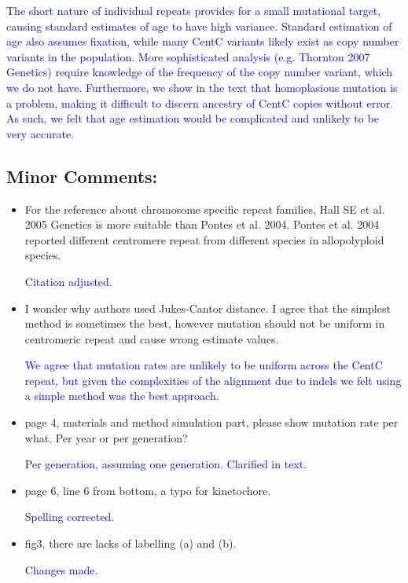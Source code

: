 \documentclass[]{article}
\newcommand{\res}[1]{\noindent \textcolor{blue}{{#1}} \\}
\begin{document}
\res{The short nature of individual repeats provides for a small mutational target, causing standard estimates of age to have high variance.  
Standard estimation of age also assumes fixation, while many CentC variants likely exist as copy number variants in the population. 
More sophisticated analysis (e.g. Thornton 2007 Genetics) require knowledge of the frequency of the copy number variant, which we do not have.
Furthermore, we show in the text that homoplasious mutation is a problem, making it difficult to discern ancestry of CentC copies without error.  
As such, we felt that age estimation would be complicated and unlikely to be very accurate.}

\subsection*{Minor Comments:}

\begin{itemize}
\item For the reference about chromosome specific repeat families, Hall SE et al. 2005 Genetics is more suitable than Pontes et al. 2004. Pontes et al. 2004 reported different centromere repeat from different species in allopolyploid species.

\res{Citation adjusted.}

\item I wonder why authors used Jukes-Cantor distance. I agree that the simplest method is sometimes the best, however mutation should not be uniform in centromeric repeat and cause wrong estimate values. 

\res{We agree that mutation rates are unlikely to be uniform across the CentC repeat, but given the complexities of the alignment due to indels we felt using a simple method was the best approach. }

\item page 4, materials and method simulation part, please show mutation rate per what. Per year or per generation? 

\res{Per generation, assuming one generation.  Clarified in text.}

\item page 6, line 6 from bottom, a typo for kinetochore.

\res{Spelling corrected.}

\item fig3, there are lacks of labelling (a) and (b). 

\res{Changes made.}

\end{itemize}
\end{document}
